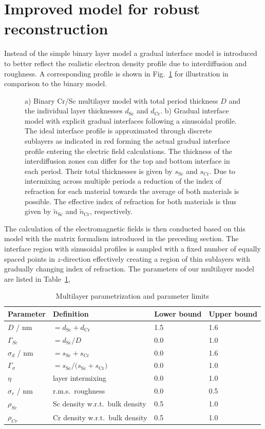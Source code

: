 \section{Improved model for robust reconstruction} \label{sec:model}

Instead of the simple binary layer model a gradual interface model is introduced to better reflect the realistic electron density profile due to interdiffusion and roughness. A corresponding profile is shown in Fig.~\ref{fig:CrScModel} for illustration in comparison to the binary model.
\begin{figure}
  
  \caption{a) Binary Cr/Sc multilayer model with total period thickness $D$ and the individual layer thicknesses $d_\text{Sc}$ and $d_\text{Cr}$. b) Gradual interface model with explicit gradual interfaces following a sinusoidal profile. The ideal interface profile is approximated through discrete sublayers as indicated in red forming the actual gradual interface profile entering the electric field calculations. The thickness of the interdiffusion zones can differ for the top and bottom interface in each period. Their total thicknesses is given by $s_\text{Sc}$ and $s_\text{Cr}$. Due to intermixing across multiple periods a reduction of the index of refraction for each material towards the average of both materials is possible. The effective index of refraction for both materials is thus given by $\tilde{n}_\text{Sc}$ and $\tilde{n}_\text{Cr}$, respectively.}
  \label{fig:CrScModel}
\end{figure}
The calculation of the electromagnetic fields is then conducted based on this model with the matrix formalism introduced in the preceding section. The interface region with sinusoidal profiles is sampled with a fixed number of equally spaced points in $z$-direction effectively creating a region of thin sublayers with gradually changing index of refraction. The parameters of our multilayer model are listed in Table~\ref{tbl:parametrization},
\begin{table}
\centering
\caption{Multilayer parametrization and parameter limits}
\label{tbl:parametrization}
\begin{tabular}{@{}llll@{}}
\toprule
Parameter & Definition & Lower bound & Upper bound\\ \midrule
$D$ / nm & $= d_\text{Sc} + d_\text{Cr}$ & 1.5&1.6 \\ 
$\Gamma_{Sc}$ & $= d_\text{Sc} / D$&0.0 &1.0 \\ 
$\sigma_d$ / nm&$=s_\text{Sc} + s_\text{Cr}$&0.0 & 1.6\protect\footnotemark\\ 
$\Gamma_\sigma$ &$= s_\text{Sc} / \big(s_\text{Sc} + s_\text{Cr}\big)$& 0.0& 1.0\\ 
$\eta$ &layer intermixing& 0.0& 1.0\\ 
$\sigma_r$ / nm & r.m.s.~roughness& 0.0& 0.5\\ 
$\rho_{Sc}$ &Sc density w.r.t.~bulk density & 0.5& 1.0\\ 
$\rho_{Cr}$ &Cr density w.r.t.~bulk density& 0.5& 1.0\\ 
 \bottomrule
\end{tabular}
\end{table}
